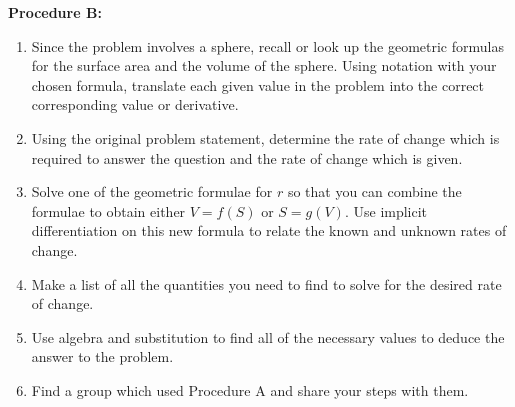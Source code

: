 \documentclass{ximera}
\begin{document}
\begin{exercise} \textbf{Procedure B:}
\begin{enumerate}
    \item Since the problem involves a sphere, recall or look up the geometric formulas for the surface area and the volume of the sphere.  Using notation with your chosen formula, translate each given value in the problem into the correct corresponding value or derivative.
    \item Using the original problem statement, determine the rate of change which is required to answer the question and the rate of change which is given.
    \item Solve one of the geometric formulae for $r$ so that you can combine the formulae to obtain either $V=f(S)$ or $S=g(V)$.  Use implicit differentiation on this new formula to relate the known and unknown rates of change. 
    \item Make a list of all the quantities you need to find to solve for the desired rate of change.
   
    \item Use algebra and substitution to find all of the necessary values to deduce the answer to the problem.  
    \item Find a group which used Procedure A and share your steps with them.
\end{enumerate}
\end{exercise}
\end{document}
